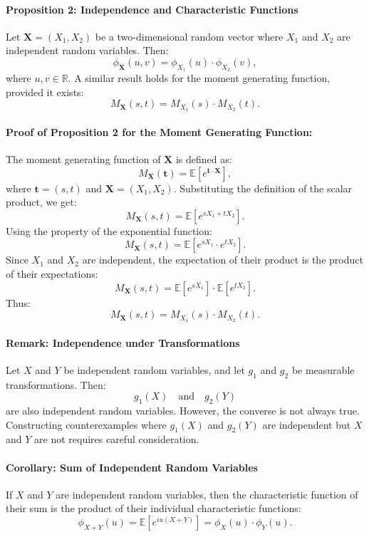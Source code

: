     \paragraph{Proposition 2: Independence and Characteristic Functions}
    Let \( \mathbf{X} = (X_1, X_2) \) be a two-dimensional random vector where \( X_1 \) and \( X_2 \) are independent random variables. Then:
    \[
    \phi_{\mathbf{X}}(u, v) = \phi_{X_1}(u) \cdot \phi_{X_2}(v),
    \]
    where \( u, v \in \mathbb{R} \). A similar result holds for the moment generating function, provided it exists:
    \[
    M_{\mathbf{X}}(s, t) = M_{X_1}(s) \cdot M_{X_2}(t).
    \]
    
    \paragraph{Proof of Proposition 2 for the Moment Generating Function:}
    The moment generating function of \( \mathbf{X} \) is defined as:
    \[
    M_{\mathbf{X}}(\mathbf{t}) = \mathbb{E}\left[e^{\mathbf{t} \cdot \mathbf{X}}\right],
    \]
    where \( \mathbf{t} = (s, t) \) and \( \mathbf{X} = (X_1, X_2) \). Substituting the definition of the scalar product, we get:
    \[
    M_{\mathbf{X}}(s, t) = \mathbb{E}\left[e^{s X_1 + t X_2}\right].
    \]
    Using the property of the exponential function:
    \[
    M_{\mathbf{X}}(s, t) = \mathbb{E}\left[e^{s X_1} \cdot e^{t X_2}\right].
    \]
    Since \( X_1 \) and \( X_2 \) are independent, the expectation of their product is the product of their expectations:
    \[
    M_{\mathbf{X}}(s, t) = \mathbb{E}\left[e^{s X_1}\right] \cdot \mathbb{E}\left[e^{t X_2}\right].
    \]
    Thus:
    \[
    M_{\mathbf{X}}(s, t) = M_{X_1}(s) \cdot M_{X_2}(t).
    \]
    
    \paragraph{Remark: Independence under Transformations}
    Let \( X \) and \( Y \) be independent random variables, and let \( g_1 \) and \( g_2 \) be measurable transformations. Then:
    \[
    g_1(X) \quad \text{and} \quad g_2(Y)
    \]
    are also independent random variables. However, the converse is not always true. Constructing counterexamples where \( g_1(X) \) and \( g_2(Y) \) are independent but \( X \) and \( Y \) are not requires careful consideration.
    
    \paragraph{Corollary: Sum of Independent Random Variables}
    If \( X \) and \( Y \) are independent random variables, then the characteristic function of their sum is the product of their individual characteristic functions:
    \[
    \phi_{X+Y}(u) = \mathbb{E}\left[e^{i u (X + Y)}\right] = \phi_X(u) \cdot \phi_Y(u).
    \] 
